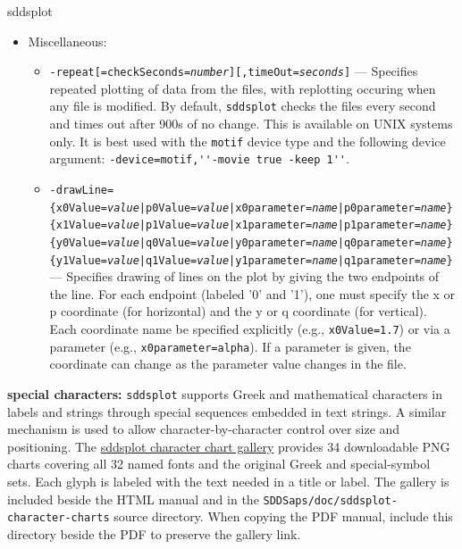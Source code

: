 \begin{sddsprog}{sddsplot}
\begin{itemize}
\begin{itemize}
The use of several match tests and logic is done just as for {\tt -filter}.  For example, to match
all the rows for which the column {\tt Name} starts with 'A' or 'B', one could use
{\tt -match=column,Name=A*,Name=B*,|}.  (This could also be done with {\tt -match=column,Name=[AB]*}.)
  \end{itemize}
\item {Miscellaneous:}
\begin{itemize}
        \item {\tt -repeat[=checkSeconds={\em number}][,timeOut={\em seconds}]} ---
Specifies repeated plotting of data from the files, with replotting occuring when any
file is modified.  By default, \verb|sddsplot| checks the files every second and times out
after 900s of no change.  This is available on UNIX systems only.  It is best used with
the \verb|motif| device type and the following device argument:
\verb|-device=motif,''-movie true -keep 1''|.
        \item {\tt -drawLine=}
        {\tt \{x0Value={\em value}|p0Value={\em value}|x0parameter={\em name}|p0parameter={\em name}\}}
        {\tt \{x1Value={\em value}|p1Value={\em value}|x1parameter={\em name}|p1parameter={\em name}\}}
        {\tt \{y0Value={\em value}|q0Value={\em value}|y0parameter={\em name}|q0parameter={\em name}\}}
        {\tt \{y1Value={\em value}|q1Value={\em value}|y1parameter={\em name}|q1parameter={\em name}\}} ---
        Specifies drawing of lines on the plot by giving the two endpoints of the line.
        For each endpoint (labeled '0' and '1'), one must specify the x or p coordinate (for horizontal) and
        the y or q coordinate (for vertical).  Each coordinate name be specified explicitly (e.g.,
        \verb|x0Value=1.7|) or via a parameter (e.g., \verb|x0parameter=alpha|).  If a parameter is
        given, the coordinate can change as the parameter value changes in the file.
        
\end{itemize}

\end{itemize}

  \item \textbf{special characters:}
\verb|sddsplot| supports Greek and mathematical characters in labels and strings through special sequences embedded in
text strings.  A similar mechanism is used to allow character-by-character control over size and positioning.
The \href{sddsplot-character-charts/index.html}{sddsplot character chart gallery}
provides 34 downloadable PNG charts covering all 32 named fonts and the original
Greek and special-symbol sets. Each glyph is labeled with the text needed in a
title or label. The gallery is included beside the HTML manual and in the
\verb|SDDSaps/doc/sddsplot-character-charts| source directory. When copying the
PDF manual, include this directory beside the PDF to preserve the gallery link.


\end{sddsprog}
